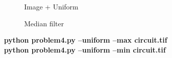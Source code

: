 \begin{figure}[!htb]
\begin{minipage}{0.45\textwidth}
        \caption{\small{Image + Uniform}}
    \end{minipage}
\end{figure}

\begin{figure}[!htb]\centering
    \begin{minipage}{0.45\textwidth}
        \caption{\small{Median filter}}\label{diagram:uniform_median}
    \end{minipage}
\end{figure}

\pagebreak
\begin{minipage}{\textwidth}
\textbf{python problem4.py --uniform --max circuit.tif} \\
\textbf{python problem4.py --uniform --min circuit.tif} \\
\end{minipage}

